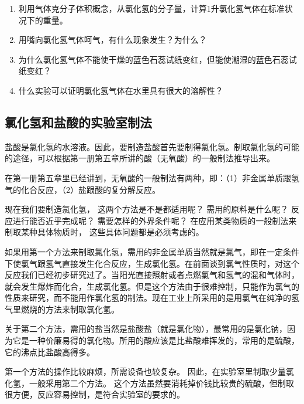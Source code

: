 \begin{enumerate}
\item
  利用气体克分子体积概念，从氯化氢的分子量，计算1升氯化氢气体在标准状况下的重量。
\item
  用嘴向氯化氢气体呵气，有什么现象发生？为什么？
\item
  为什么氯化氢气体不能使干燥的蓝色石蕊试纸变红，但能使潮湿的蓝色石蕊试纸变红？
\item
  什么实验可以证明氯化氢气体在水里具有很大的溶解性？
\end{enumerate}

\subsection{氯化氢和盐酸的实验室制法}

盐酸是氯化氢的水溶液。因此，要制造盐酸首先要制得氯化氢。制取氯化氢的可能的途径，可以根据第一册第五章所讲的酸（无氧酸）的一般制法推导出来。

在第一册第五章里已经讲到，无氧酸的一般制法有两种，即：（1）非金属单质跟氢气的化合反应，（2）盐跟酸的复分解反应。

现在我们要制造氯化氢， 这两个方法是不是都适用呢？ 需用的原料是什么呢？
反应进行能否近乎完成呢？ 需要怎样的外界条件呢？
在应用某类物质的一般制法来制取某种具体物质时，
这些具体问题都是必须考虑的。

如果用第一个方法来制取氯化氢，需用的非金属单质当然就是氯气，即在一定条件下使氯气跟氢气直接发生化合反应，生成氯化氢。在前面谈到氯气性质时，对这个反应我们已经初步研究过了。当阳光直接照射或者点燃氯气和氢气的混和气体时，就会发生爆炸而化合，生成氯化氢。但是这个方法由于很难控制，只能作为氯气的性质来研究，而不能用作氯化氢的制法。现在工业上所采用的是用氯气在纯净的氢气里燃烧的方法来制取氯化氢。

关于第二个方法，需用的盐当然是盐酸盐（就是氯化物），最常用的是氯化钠，因为它是一种价廉易得的氯化物。所用的酸应该是比盐酸难挥发的，常用的是硫酸，它的沸点比盐酸高得多。

第一个方法的操作比较麻烦，所需设备也较复杂。
因此，在实验室里制取少量氯化氢，一般采用第二个方法。
这个方法虽然要消耗掉价钱比较贵的硫酸，但制取很方便，反应容易控制，是符合实验室的要求的。

